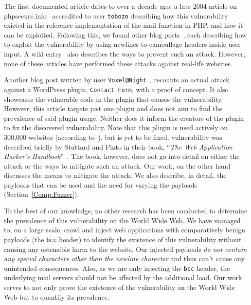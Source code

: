 The first documented article dates to over a decade ago; a late 2004 article on phpsecure.info~\cite{Tobozo} accredited to user \lstinline|tobozo| describing how this vulnerability existed in the reference implementation of the mail function in PHP, and how it can be exploited. Following this, we found other blog posts~\cite{Calin,DK,Injection2,Nicol,Pope}, each describing how to exploit the vulnerability by using newlines to camouflage headers inside user input. A wiki entry~\cite{Injection} also describes the ways to prevent such an attack. However, none of these articles have performed these attacks against real-life websites.

Another blog post written by user \lstinline|Voxel@Night|~\cite{Tendencies2014}, recounts an actual attack against a WordPress plugin, \texttt{Contact Form}, with a proof of concept\footnotemark. It also showcases the vulnerable code in the plugin that causes the vulnerability. However, this article targets just one plugin and does not aim to find the prevalence of said plugin usage. Neither does it inform the creators of the plugin to fix the discovered vulnerability. Note that this plugin is used actively on 300,000 websites (according to~\cite{BestWebSoft2016}), but is yet to be fixed.
\ehi vulnerability was described briefly by Stuttard and Pinto in their book, ``\emph{The Web Application Hacker's Handbook}''~\cite{stuttard2011web}. The book, however, does not go into detail on either the attack or the ways to mitigate such an attack. Our work, on the other hand discusses the means to mitigate the attack. We also describe, in detail, the payloads that can be used and the need for varying the payloads (Section~\ref{Comp:Fuzzer}).

To the best of our knowledge, no other research has been conducted to determine the prevalence of this vulnerability on the World Wide Web. We have managed to, on a large scale, crawl and inject web applications with comparatively benign payloads (the \texttt{bcc} header) to identify the existence of this vulnerability without causing any ostensible harm to the website. Our injected payloads \emph{do not contain any special characters other than the newline character} and thus can't cause any unintended consequences. Also, as we are only injecting the \texttt{bcc} header, the underlying mail servers should not be affected by the additional load. Our work serves to not only prove the existence of the vulnerability on the World Wide Web but to quantify its prevalence.
